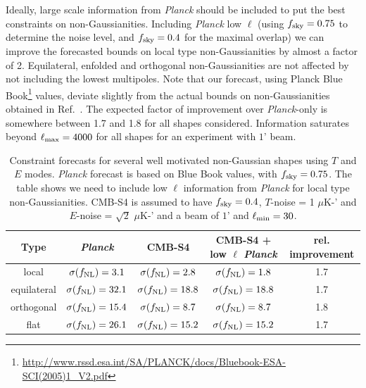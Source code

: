 Ideally, large scale information from {\it Planck\/} \cite{Ade:2015ava} should be included to put the best constraints on non-Gaussianities. Including {\it Planck\/} low $\ell$ (using $f_{\rm sky} = 0.75$ \cite{Ade:2015ava} to determine the noise level, and $f_{\rm sky}=0.4$ for the maximal overlap) we can improve the forecasted bounds on local type non-Gaussianities by almost a factor of 2. Equilateral, enfolded and orthogonal non-Gaussianities are not affected by not including the lowest multipoles. Note that our forecast, using Planck Blue Book\footnote{\url{http://www.rssd.esa.int/SA/PLANCK/docs/Bluebook-ESA-SCI(2005)1_V2.pdf}} values, deviate slightly from the actual bounds on non-Gaussianities obtained in Ref.~\cite{Ade:2015ava}. The expected factor of improvement over {\it Planck}-only is somewhere between 1.7 and 1.8 for all shapes considered. Information saturates beyond $\ell_{\rm max} = 4000$ for all shapes for an experiment with $1$' beam. 

\begin{table}[t]
  \begin{center}
    \begin{tabular}{ | c || c | c | c | c |}
      \hline
      Type & {\it Planck} & CMB-S4 & CMB-S4 + low $\ell$ {\it Planck} & rel. improvement \\ \hline \hline
      local & $\sigma(f_{\rm NL}) = 3.1$ & $\sigma(f_{\rm NL}) = 2.8$ &  $\sigma(f_{\rm NL}) = 1.8$ & 1.7\\ \hline 
      equilateral &  $\sigma(f_{\rm NL}) = 32.1$ & $\sigma(f_{\rm NL}) = 18.8$ &  $\sigma(f_{\rm NL}) = 18.8$ & 1.7\\ \hline 
      orthogonal &  $\sigma(f_{\rm NL}) = 15.4$ & $\sigma(f_{\rm NL}) = 8.7$ &  $\sigma(f_{\rm NL}) = 8.7$ & 1.8\\ \hline 
      flat &  $\sigma(f_{\rm NL}) = 26.1$ & $\sigma(f_{\rm NL}) = 15.2$ &  $\sigma(f_{\rm NL}) = 15.2$ & 1.7\\ \hline 
    \end{tabular}
  \end{center}
  \caption{Constraint forecasts for several well motivated non-Gaussian shapes using $T$ and $E$ modes. {\it Planck\/} forecast is based on Blue Book values, with $f_{\rm sky} = 0.75$. The table shows we need to include low $\ell$ information from {\it Planck\/} for local type non-Gaussianities. CMB-S4 is assumed to have $f_{\rm sky} = 0.4$, $T$-noise = 1 $\mu$K-' and $E$-noise = $\sqrt{2}$ $\mu$K-' and a beam of $1$' and $\ell_{\rm min} = 30$.}
  \label{tab:fnl_forecast}
\end{table}

